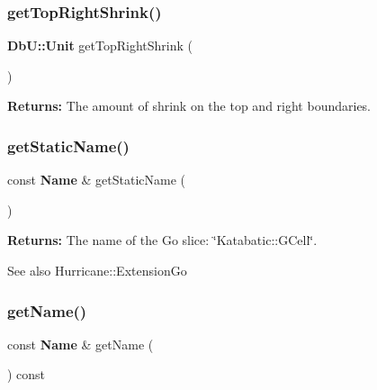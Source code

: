 \subsubsection{\texorpdfstring{get\+Top\+Right\+Shrink()}{getTopRightShrink()}}
{\footnotesize\ttfamily \textbf{ Db\+U\+::\+Unit} get\+Top\+Right\+Shrink (\begin{DoxyParamCaption}{ }\end{DoxyParamCaption})\hspace{0.3cm}{\ttfamily [static]}}

{\bfseries Returns\+:} The amount of shrink on the top and right boundaries. \mbox{\label{classKatabatic_1_1GCell_a00e56270cfb31f56e52e31afbc33ba71}} 
\subsubsection{\texorpdfstring{get\+Static\+Name()}{getStaticName()}}
{\footnotesize\ttfamily const \textbf{ Name} \& get\+Static\+Name (\begin{DoxyParamCaption}{ }\end{DoxyParamCaption})\hspace{0.3cm}{\ttfamily [static]}}

{\bfseries Returns\+:} The name of the Go slice\+: {\ttfamily \char`\"{}\+Katabatic\+::\+G\+Cell\char`\"{}}.

\begin{DoxySeeAlso}{See also}
Hurricane\+::\+Extension\+Go 
\end{DoxySeeAlso}
\mbox{\label{classKatabatic_1_1GCell_a9e76ae5cee9320b65251387419c9432b}} 
\subsubsection{\texorpdfstring{get\+Name()}{getName()}}
{\footnotesize\ttfamily const \textbf{ Name} \& get\+Name (\begin{DoxyParamCaption}{ }\end{DoxyParamCaption}) const\hspace{0.3cm}{\ttfamily [virtual]}}

